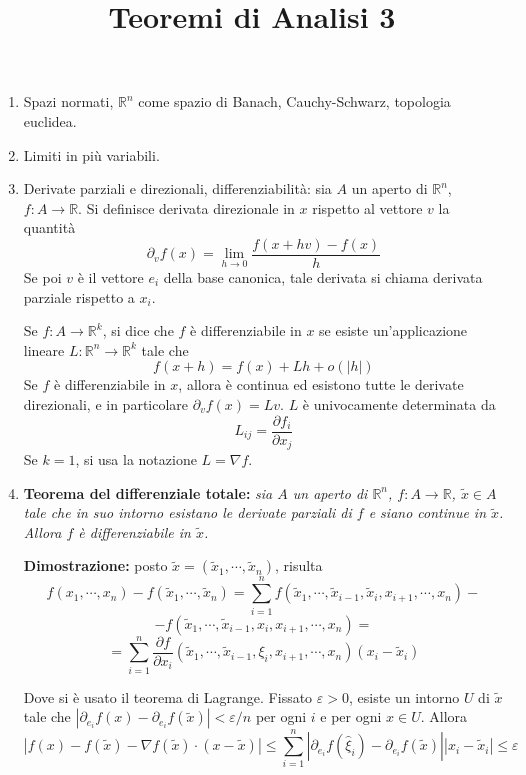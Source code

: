 \documentclass[a4paper,11pt]{article}
\title{Teoremi di Analisi 3}
\begin{document}
\maketitle
\begin{enumerate}
	\item Spazi normati, $\mathbb{R}^n$ come spazio di Banach, Cauchy-Schwarz, topologia euclidea.
	\item Limiti in più variabili.
	\item Derivate parziali e direzionali, differenziabilità: sia $A$ un aperto di $\mathbb{R}^n$, $f\colon A\to\mathbb{R}$. Si definisce derivata direzionale in $x$ rispetto al vettore $v$ la quantità
	\[\partial_vf(x)=\lim\limits_{h\to 0}\frac{f(x+hv)-f(x)}{h}\]
	Se poi $v$ è il vettore $e_i$ della base canonica, tale derivata si chiama derivata parziale rispetto a $x_i$.
	
	Se $f\colon A\to\mathbb{R}^k$, si dice che $f$ è differenziabile in $x$ se esiste un'applicazione lineare $L\colon\mathbb{R}^n\to\mathbb{R}^k$ tale che
	\[f(x+h)=f(x)+Lh+o(|h|)\]
	Se $f$ è differenziabile in $x$, allora è continua ed esistono tutte le derivate direzionali, e in particolare $\partial_vf(x)=Lv$. $L$ è univocamente determinata da
	\[L_{ij}=\frac{\partial f_i}{\partial x_j}\]
	Se $k=1$, si usa la notazione $L=\nabla f$.
	\item \textbf{Teorema del differenziale totale:} \textit{sia $A$ un aperto di $\mathbb{R}^n$, $f\colon A\to\mathbb{R}$, $\tilde{x}\in A$ tale che in suo intorno esistano le derivate parziali di $f$ e siano continue in $\tilde{x}$. Allora $f$ è differenziabile in $\tilde{x}$.}
	
	\textbf{Dimostrazione:} posto $\tilde{x}=(\tilde{x}_1,\cdots,\tilde{x}_n)$, risulta
	\[f(x_1,\cdots,x_n)-f(\tilde{x}_1,\cdots,\tilde{x}_n)=\sum_{i=1}^{n}f(\tilde{x}_1,\cdots,\tilde{x}_{i-1},\tilde{x}_i,x_{i+1},\cdots,x_n)-\]
	\[-f(\tilde{x}_1,\cdots,\tilde{x}_{i-1},x_i,x_{i+1},\cdots,x_n)=\]
	\[=\sum_{i=1}^{n}\frac{\partial f}{\partial x_i}(\tilde{x}_1,\cdots,\tilde{x}_{i-1},\xi_i,x_{i+1},\cdots,x_n)(x_i-\tilde{x}_i)\]
	
	Dove si è usato il teorema di Lagrange. Fissato $\varepsilon>0$, esiste un intorno $U$ di $\tilde{x}$ tale che $\left|\partial_{e_i}f(x)-\partial_{e_i}f(\tilde{x})\right|<\varepsilon/n$ per ogni $i$ e per ogni $x\in U$. Allora
	\[\left|f(x)-f(\tilde{x})-\nabla f(\tilde{x})\cdot(x-\tilde{x})\right|\leq\sum_{i=1}^{n}\left|\partial_{e_i}f(\hat{\xi}_i)-\partial_{e_i}f(\tilde{x})\right|\left|x_i-\tilde{x}_i\right|\leq\varepsilon\]
	

\end{enumerate}
\end{document}
